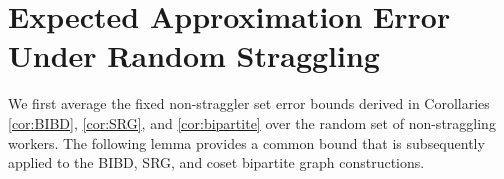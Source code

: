 \documentclass[journal,draftcls,onecolumn]{IEEEtran}
\theoremstyle{mystyle}
\begin{document}









% 







\appendices
\section{Expected Approximation Error Under Random Straggling}
\label{sec:exp_app_err_rand_strr}
We first average the fixed non-straggler set error bounds derived in Corollaries \ref{cor:BIBD}, \ref{cor:SRG}, and \ref{cor:bipartite} over the random set of non-straggling workers. The following lemma provides a common bound that is subsequently applied to the BIBD, SRG, and coset bipartite graph constructions.
\end{document}
